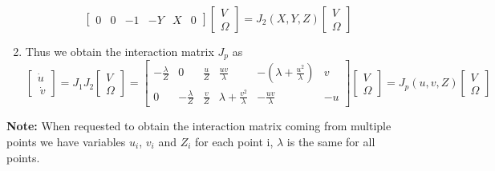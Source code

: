 \documentclass[a4paper,12pt]{article}
\begin{document}
\begin{enumerate}
\begin{equation}
\begin{bmatrix}
            0 & 0 & -1 & -Y & X & 0
        \end{bmatrix}
        \begin{bmatrix}
            V \\
            \Omega
        \end{bmatrix}= J_2(X,Y,Z)\begin{bmatrix}
        V\\
        \Omega
        \end{bmatrix}
    \end{equation}
    \item Thus we obtain the interaction matrix $J_p$ as
    \begin{equation}
        \begin{bmatrix}
            \dot{u}\\\
            \dot{v}
        \end{bmatrix}=J_1J_2\begin{bmatrix}
            V\\
            \Omega
        \end{bmatrix}=\begin{bmatrix}
        -\frac{\lambda}{Z} & 0 & \frac{u}{Z} & \frac{uv}{\lambda} & -(\lambda + \frac{u^2}{\lambda}) & v\\
        0 & -\frac{\lambda}{Z} & \frac{v}{Z} & \lambda + \frac{v^2}{\lambda} & -\frac{uv}{\lambda} & -u
        \end{bmatrix} \begin{bmatrix}
            V\\
            \Omega
        \end{bmatrix}=J_p(u,v,Z)\begin{bmatrix}
        V\\
        \Omega
        \end{bmatrix}
    \end{equation}
\end{enumerate}
\textbf{Note:} When requested to obtain the interaction matrix 
coming from multiple points we have variables $u_i$, $v_i$ and $Z_i$
for each point i, $\lambda$ is the same for all points.
\end{document}

